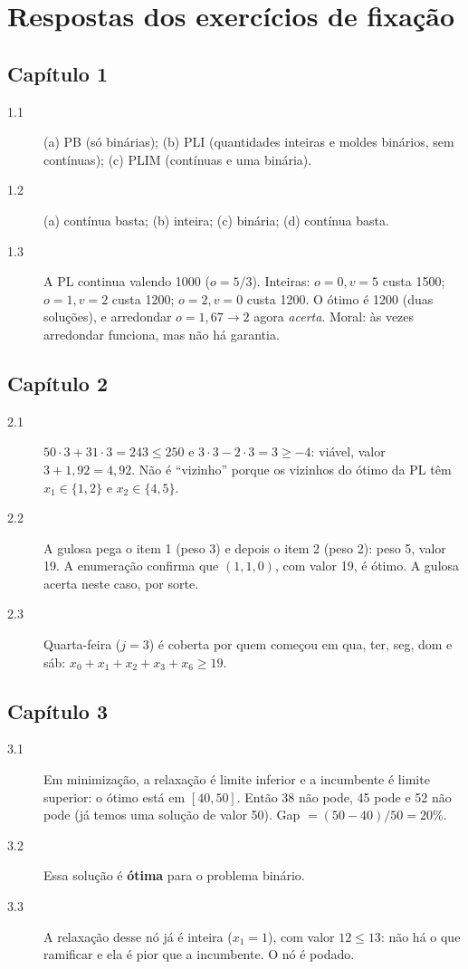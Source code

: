 \chapter{Respostas dos exercícios de fixação}
\label{ap:respostas}

\section*{Capítulo 1}
\begin{description}
  \item[1.1] (a) PB (só binárias); (b) PLI (quantidades inteiras e moldes binários, sem contínuas); (c) PLIM
  (contínuas e uma binária).
  \item[1.2] (a) contínua basta; (b) inteira; (c) binária; (d) contínua basta.
  \item[1.3] A PL continua valendo 1000 ($o=5/3$). Inteiras: $o=0,v=5$ custa 1500; $o=1,v=2$ custa 1200; $o=2,v=0$
  custa 1200. O ótimo é 1200 (duas soluções), e arredondar $o=1{,}67\to2$ agora \emph{acerta}. Moral: às vezes
  arredondar funciona, mas não há garantia.
\end{description}

\section*{Capítulo 2}
\begin{description}
  \item[2.1] $50\cdot3+31\cdot3=243\le250$ e $3\cdot3-2\cdot3=3\ge-4$: viável, valor $3+1{,}92=4{,}92$. Não é
  ``vizinho'' porque os vizinhos do ótimo da PL têm $x_1\in\{1,2\}$ e $x_2\in\{4,5\}$.
  \item[2.2] A gulosa pega o item 1 (peso 3) e depois o item 2 (peso 2): peso 5, valor 19. A enumeração confirma que
  $(1,1,0)$, com valor 19, é ótimo. A gulosa acerta neste caso, por sorte.
  \item[2.3] Quarta-feira ($j=3$) é coberta por quem começou em qua, ter, seg, dom e sáb:
  $x_0+x_1+x_2+x_3+x_6\ge19$.
\end{description}

\section*{Capítulo 3}
\begin{description}
  \item[3.1] Em minimização, a relaxação é limite inferior e a incumbente é limite superior: o ótimo está em
  $[40,50]$. Então 38 não pode, 45 pode e 52 não pode (já temos uma solução de valor 50). Gap $=(50-40)/50=20\%$.
  \item[3.2] Essa solução é \textbf{ótima} para o problema binário.
  \item[3.3] A relaxação desse nó já é inteira ($x_1=1$), com valor $12\le13$: não há o que ramificar e ela é pior
  que a incumbente. O nó é podado.
\end{description}

